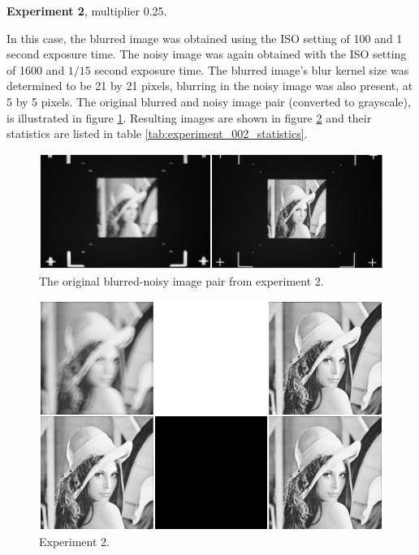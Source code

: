 \documentclass[12pt,notitlepage]{report}
\begin{document}
\noindent \textbf{Experiment 2}, multiplier 0.25.

In this case, the blurred image was obtained using the ISO setting of 100 and 1 second exposure time. The noisy image was again obtained with the ISO setting of 1600 and $1/15$ second exposure time. The blurred image's blur kernel size was determined to be 21 by 21 pixels, blurring in the noisy image was also present, at 5 by 5 pixels. The original blurred and noisy image pair (converted to grayscale), is illustrated in figure \ref{fig:experiment_002_blurred_noisy}. Resulting images are shown in figure \ref{fig:experiment_002_complete} and their statistics are listed in table \ref{tab:experiment_002_statistics}.

\begin{figure}[htb]
 \begin{center}
  \includegraphics[width=12cm]{experiment_002_blurred_noisy.png}
 \end{center}
 \caption{The original blurred-noisy image pair from experiment 2.}
 \label{fig:experiment_002_blurred_noisy}
\end{figure}

\begin{figure}[htb]
 \begin{center}
  \includegraphics[width=12cm]{experiment_002_complete.png}
 \end{center}
 \caption{Experiment 2.}
 \label{fig:experiment_002_complete}
\end{figure}
\end{document}
